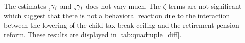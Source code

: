 \begin{subappendices}
The estimates $\prescript{}{b}\gamma_{i}$ and $\prescript{}{o}\gamma_{i}$ does not vary much. The $\zeta$ terms are not significant which suggest that there is not a behavioral reaction due to the interaction between the lowering of the child tax break ceiling and the retirement pension reform. These results are displayed in \autoref{tab:quadruple_diff}. 









\begin{table}[H]
\center
\vspace{-1cm}
\caption{Retirement pension reform: quadruple-diff}
\end{table}
\end{subappendices}
